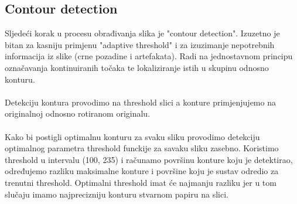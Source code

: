 \documentclass{article}
\begin{document}
\subsection{Contour detection}
Sljedeći korak u procesu obrađivanja slika je "contour detection". Izuzetno je bitan za kasniju primjenu "adaptive threshold" i za izuzimanje nepotrebnih informacija iz slike (crne pozadine i artefakata). Radi na jednostavnom principu označavanja kontinuiranih točaka te lokaliziranje istih u skupinu odnosno konturu.\\ \\
Detekciju kontura provodimo na threshold slici a konture primjenjujemo na originalnoj odnosno rotiranom originalu.\\ %
\\
Kako bi postigli optimalnu konturu za svaku sliku provodimo detekciju optimalnog parametra threshold funckije za savaku sliku zasebno.
Koristimo threshold u intervalu (100, 235) i računamo površinu konture koju je detektirao, određujemo razliku maksimalne konture i površine koju je sustav odredio za trenutni threshold. Optimalni threshold imat će najmanju razliku jer u tom slučaju imamo najprecizniju konturu stvarnom papiru na slici.
\newline
\end{document}
